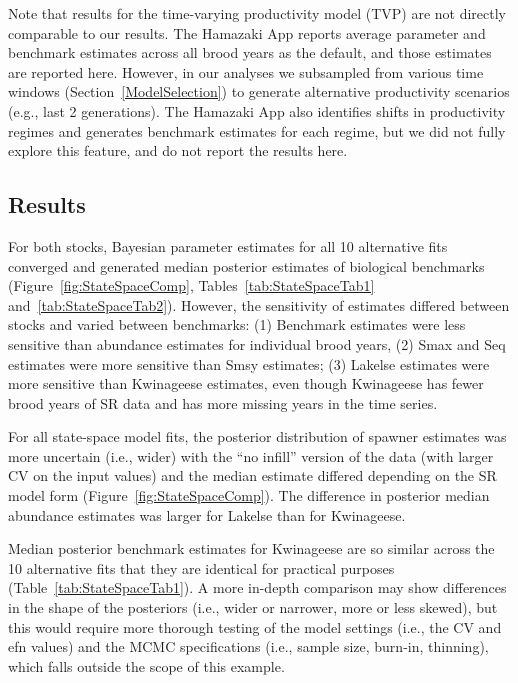 \documentclass[french,11pt]{book}
\begin{document}
Note that results for the time-varying productivity model (TVP) are not directly comparable to our results. The Hamazaki App reports average parameter and benchmark estimates across all brood years as the default, and those estimates are reported here. However, in our analyses we subsampled from various time windows (Section~\ref{ModelSelection}) to generate alternative productivity scenarios (e.g., last 2 generations). The Hamazaki App also identifies shifts in productivity regimes and generates benchmark estimates for each regime, but we did not fully explore this feature, and do not report the results here.

\subsection{Results}\label{results-3}

For both stocks, Bayesian parameter estimates for all 10 alternative fits converged and generated median posterior estimates of biological benchmarks (Figure~\ref{fig:StateSpaceComp}, Tables~\ref{tab:StateSpaceTab1} and~\ref{tab:StateSpaceTab2}). However, the sensitivity of estimates differed between stocks and varied between benchmarks: (1) Benchmark estimates were less sensitive than abundance estimates for individual brood years, (2) Smax and Seq estimates were more sensitive than Smsy estimates; (3) Lakelse estimates were more sensitive than Kwinageese estimates, even though Kwinageese has fewer brood years of SR data and has more missing years in the time series.

For all state-space model fits, the posterior distribution of spawner estimates was more uncertain (i.e., wider) with the ``no infill'' version of the data (with larger CV on the input values) and the median estimate differed depending on the SR model form (Figure~\ref{fig:StateSpaceComp}). The difference in posterior median abundance estimates was larger for Lakelse than for Kwinageese.

Median posterior benchmark estimates for Kwinageese are so similar across the 10 alternative fits that they are identical for practical purposes (Table~\ref{tab:StateSpaceTab1}). A more in-depth comparison may show differences in the shape of the posteriors (i.e., wider or narrower, more or less skewed), but this would require more thorough testing of the model settings (i.e., the CV and efn values) and the MCMC specifications (i.e., sample size, burn-in, thinning), which falls outside the scope of this example.
\end{document}
